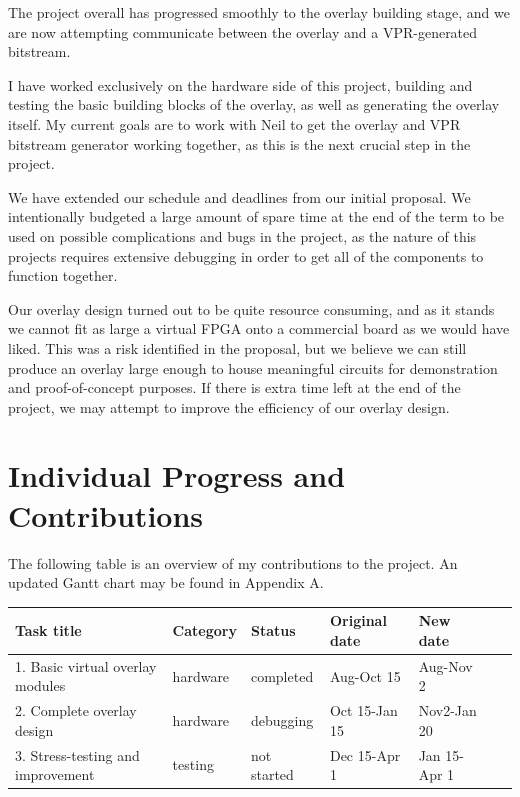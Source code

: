 \documentclass[12pt,letterpaper]{article}
\begin{document}
The project overall has progressed smoothly to the overlay building stage, and we are now attempting communicate between the overlay and a VPR-generated bitstream.

I have worked exclusively on the hardware side of this project, building and testing the basic building blocks of the overlay, as well as generating the overlay itself. 
My current goals are to work with Neil to get the overlay and VPR bitstream generator working together, as this is the next crucial step in the project.

We have extended our schedule and deadlines from our initial proposal.
We intentionally budgeted a large amount of spare time at the end of the term to be used on possible complications and bugs in the project, as the nature of this projects requires extensive debugging in order to get all of the components to function together.

Our overlay design turned out to be quite resource consuming, and as it stands we cannot fit as large a virtual FPGA onto a commercial board as we would have liked.
This was a risk identified in the proposal, but we believe we can still produce an overlay large enough to house meaningful circuits for demonstration and proof-of-concept purposes.
If there is extra time left at the end of the project, we may attempt to improve the efficiency of our overlay design.

\pagebreak
{}

\section{Individual Progress and Contributions}

The following table is an overview of my contributions to the project.
An updated Gantt chart may be found in Appendix A.

\begin{tabular}{|l|l|l|l|l|l|l|}
\hline
\textbf{Task title} & \textbf{Category} & \textbf{Status} & \textbf{Original date} & \textbf{New date} \\ \hline
\hline
1. Basic virtual overlay modules & hardware & completed & Aug-Oct 15 & Aug-Nov 2 \\ \hline
2. Complete overlay design & hardware & debugging & Oct 15-Jan 15 & Nov2-Jan 20 \\ \hline
3. Stress-testing and improvement & testing & not started & Dec 15-Apr 1 & Jan 15-Apr 1 \\ \hline
\end{tabular}
\end{document}

